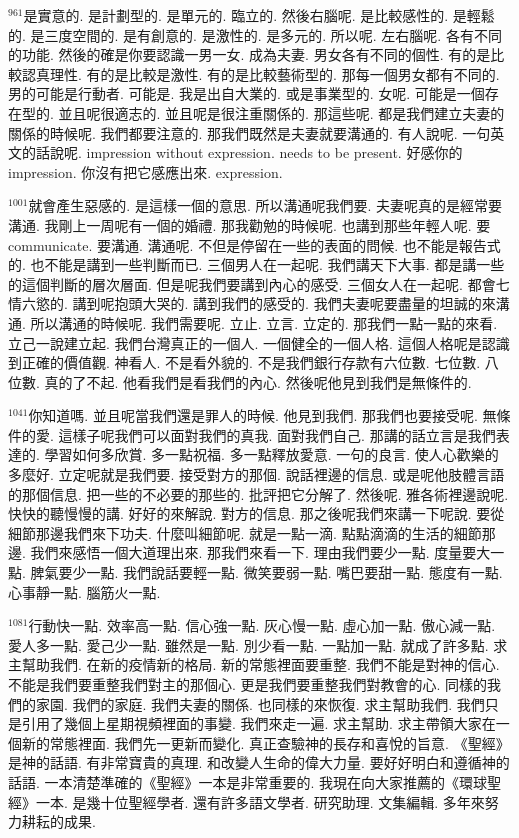 \documentclass{book}
\begin{document}
$^{961}$是實意的.
是計劃型的.
是單元的.
臨立的.
然後右腦呢.
是比較感性的.
是輕鬆的.
是三度空間的.
是有創意的.
是激性的.
是多元的.
所以呢.
左右腦呢.
各有不同的功能.
然後的確是你要認識一男一女.
成為夫妻.
男女各有不同的個性.
有的是比較認真理性.
有的是比較是激性.
有的是比較藝術型的.
那每一個男女都有不同的.
男的可能是行動者.
可能是.
我是出自大業的.
或是事業型的.
女呢.
可能是一個存在型的.
並且呢很適志的.
並且呢是很注重關係的.
那這些呢.
都是我們建立夫妻的關係的時候呢.
我們都要注意的.
那我們既然是夫妻就要溝通的.
有人說呢.
一句英文的話說呢.
impression without expression.
needs to be present.
好感你的impression.
你沒有把它感應出來.
expression.

$^{1001}$就會產生惡感的.
是這樣一個的意思.
所以溝通呢我們要.
夫妻呢真的是經常要溝通.
我剛上一周呢有一個的婚禮.
那我勸勉的時候呢.
也講到那些年輕人呢.
要communicate.
要溝通.
溝通呢.
不但是停留在一些的表面的問候.
也不能是報告式的.
也不能是講到一些判斷而已.
三個男人在一起呢.
我們講天下大事.
都是講一些的這個判斷的層次層面.
但是呢我們要講到內心的感受.
三個女人在一起呢.
都會七情六慾的.
講到呢抱頭大哭的.
講到我們的感受的.
我們夫妻呢要盡量的坦誠的來溝通.
所以溝通的時候呢.
我們需要呢.
立止.
立言.
立定的.
那我們一點一點的來看.
立己一說建立起.
我們台灣真正的一個人.
一個健全的一個人格.
這個人格呢是認識到正確的價值觀.
神看人.
不是看外貌的.
不是我們銀行存款有六位數.
七位數.
八位數.
真的了不起.
他看我們是看我們的內心.
然後呢他見到我們是無條件的.

$^{1041}$你知道嗎.
並且呢當我們還是罪人的時候.
他見到我們.
那我們也要接受呢.
無條件的愛.
這樣子呢我們可以面對我們的真我.
面對我們自己.
那講的話立言是我們表達的.
學習如何多欣賞.
多一點祝福.
多一點釋放愛意.
一句的良言.
使人心歡樂的多麼好.
立定呢就是我們要.
接受對方的那個.
說話裡邊的信息.
或是呢他肢體言語的那個信息.
把一些的不必要的那些的.
批評把它分解了.
然後呢.
雅各術裡邊說呢.
快快的聽慢慢的講.
好好的來解說.
對方的信息.
那之後呢我們來講一下呢說.
要從細節那邊我們來下功夫.
什麼叫細節呢.
就是一點一滴.
點點滴滴的生活的細節那邊.
我們來感悟一個大道理出來.
那我們來看一下.
理由我們要少一點.
度量要大一點.
脾氣要少一點.
我們說話要輕一點.
微笑要弱一點.
嘴巴要甜一點.
態度有一點.
心事靜一點.
腦筋火一點.

$^{1081}$行動快一點.
效率高一點.
信心強一點.
灰心慢一點.
虛心加一點.
傲心減一點.
愛人多一點.
愛己少一點.
雖然是一點.
別少看一點.
一點加一點.
就成了許多點.
求主幫助我們.
在新的疫情新的格局.
新的常態裡面要重整.
我們不能是對神的信心.
不能是我們要重整我們對主的那個心.
更是我們要重整我們對教會的心.
同樣的我們的家園.
我們的家庭.
我們夫妻的關係.
也同樣的來恢復.
求主幫助我們.
我們只是引用了幾個上星期視頻裡面的事變.
我們來走一遍.
求主幫助.
求主帶領大家在一個新的常態裡面.
我們先一更新而變化.
真正查驗神的長存和喜悅的旨意.
《聖經》是神的話語.
有非常寶貴的真理.
和改變人生命的偉大力量.
要好好明白和遵循神的話語.
一本清楚準確的《聖經》一本是非常重要的.
我現在向大家推薦的《環球聖經》一本.
是幾十位聖經學者.
還有許多語文學者.
研究助理.
文集編輯.
多年來努力耕耘的成果.
\end{document}
